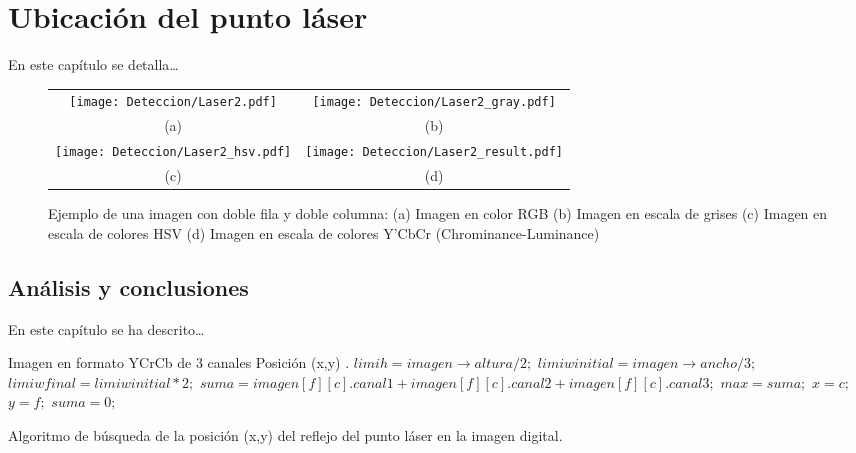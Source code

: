 \chapter{Ubicación del punto láser}
\label{cap:deteccion}
En este capítulo se detalla\ldots

\begin{figure}[h]
	\centering
	\begin{tabular}{cc}
		\texttt{[image: Deteccion/Laser2.pdf]} &
		\texttt{[image: Deteccion/Laser2\_gray.pdf]} \\
		    (a) & (b) \\
		\texttt{[image: Deteccion/Laser2\_hsv.pdf]} &
		\texttt{[image: Deteccion/Laser2\_result.pdf]} \\
		    (c) & (d)\\
	\end{tabular}
	\caption{Ejemplo de una imagen con doble fila y doble columna: 
	(a) Imagen en color RGB (b) Imagen en escala de grises (c) Imagen en escala de colores HSV 
	(d) Imagen en escala de colores Y'CbCr (Chrominance-Luminance)}
	\label{fig:filtroscolor}
\end{figure}

\section{Análisis y conclusiones}
En este capítulo se ha descrito\ldots


\begin{algorithm}[t]

\begin{algorithmic}[1]
\REQUIRE Imagen en formato YCrCb de 3 canales  
\ENSURE Posición (x,y)  .
\medskip
\STATE$ limih = imagen \rightarrow altura/2;$
\STATE $limiwinitial = imagen \rightarrow ancho/3;$
\STATE $limiwfinal = limiwinitial*2;$
\STATE $suma= imagen[f][c].canal1 + imagen[f][c].canal2 + imagen[f][c].canal3;$
\STATE $max =suma;$
\STATE $x = c;$
\STATE $y = f;$
\ENDIF
\STATE $suma=0;$
\ENDFOR
\ENDFOR
\end{algorithmic}
\caption{Algoritmo de búsqueda de la posición (x,y) del reflejo del punto láser en la imagen digital.}
\label{alg:busquedaImagen}
\end{algorithm}	
	
